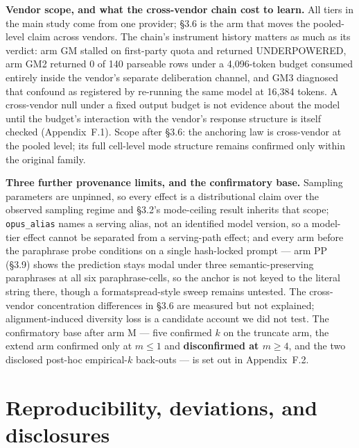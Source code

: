 \textbf{Vendor scope, and what the cross-vendor chain cost to learn.} All tiers in the main study
come from one provider; \S3.6 is the arm that moves the pooled-level claim across vendors. The
chain's instrument history matters as much as its verdict: arm GM stalled on first-party quota and
returned UNDERPOWERED, arm GM2 returned 0 of 140 parseable rows under a 4,096-token budget consumed
entirely inside the vendor's separate deliberation channel, and GM3 diagnosed that confound as
registered by re-running the same model at 16,384 tokens. A cross-vendor null under a fixed output
budget is not evidence about the model until the budget's interaction with the vendor's response
structure is itself checked (Appendix~F.1). Scope after \S3.6: the anchoring law is cross-vendor at
the pooled level; its full cell-level mode structure remains confirmed only within the original
family.

\textbf{Three further provenance limits, and the confirmatory base.} Sampling parameters are
unpinned, so every effect is a distributional claim over the observed sampling regime and \S3.2's
mode-ceiling result inherits that scope; \texttt{opus\_alias} names a serving alias, not an
identified model version, so a model-tier effect cannot be separated from a serving-path effect;
and every arm before the paraphrase probe conditions on a single hash-locked prompt
--- arm PP (\S3.9) shows the prediction stays modal under three
semantic-preserving paraphrases at all six paraphrase-cells, so the anchor is not keyed to the
literal string there, though a formatspread-style sweep \citep{sclar2024formatspread} remains untested. The
cross-vendor concentration differences in \S3.6 are measured but not explained; alignment-induced
diversity loss \citep{kirk2024rlhf} is a candidate account we did not test. The confirmatory base
after arm M --- five confirmed $k$ on the truncate arm, the extend arm confirmed only at
$m \le 1$ and \textbf{disconfirmed at $m \ge 4$}, and the two disclosed post-hoc empirical-$k$
back-outs --- is set out in Appendix~F.2.

\section{Reproducibility, deviations, and disclosures}

